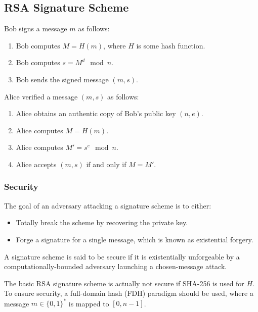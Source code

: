 \documentclass[12pt,titlepage]{article}
\begin{document}
    \subsection{RSA Signature Scheme}
      Bob signs a message $m$ as follows:
      \begin{enumerate}
        \item Bob computes $M = H(m)$, where $H$ is some hash function.
        \item Bob computes $s = M^d \mod n$.
        \item Bob sends the signed message $(m, s)$.
      \end{enumerate}

      Alice verified a message $(m, s)$ as follows:
      \begin{enumerate}
        \item Alice obtains an authentic copy of Bob's public key $(n,e)$.
        \item Alice computes $M = H(m)$.
        \item Alice computes $M' = s^e \mod n$.
        \item Alice accepts $(m, s)$ if and only if $M = M'$.
      \end{enumerate}

      \subsubsection{Security}
        The goal of an adversary attacking a signature scheme is to either:
        \begin{itemize}
          \item Totally break the scheme by recovering the private key.
          \item Forge a signature for a single message, which is known as existential forgery.
        \end{itemize}

        A signature scheme is said to be secure if it is existentially unforgeable by a
        computationally-bounded adversary launching a chosen-message attack.

        The basic RSA signature scheme is actually not secure if SHA-256 is used for $H$.
        To ensure security, a full-domain hash (FDH) paradigm should be used, where a message
        $m \in \{0, 1\}^*$ is mapped to $[0, n-1]$.
\end{document}
